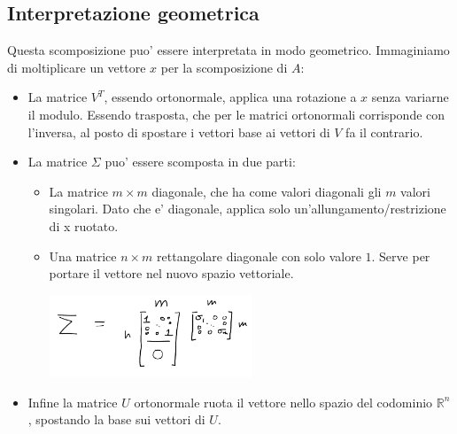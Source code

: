 \subsection{Interpretazione geometrica}
Questa scomposizione puo' essere interpretata in modo geometrico. Immaginiamo di moltiplicare un vettore $ x $ per la scomposizione di $ A $:
\begin{itemize}
  \item La matrice $ V^T $, essendo ortonormale, applica una rotazione a $ x $ senza variarne il modulo. Essendo trasposta, che per le matrici ortonormali corrisponde con l'inversa, al posto di spostare i vettori base ai vettori di $ V $ fa il contrario.
  \item La matrice $ \Sigma $ puo' essere scomposta in due parti:
    \begin{itemize}
      \item La matrice $ m \times m $ diagonale, che ha come valori diagonali gli $ m $ valori singolari. Dato che e' diagonale, applica solo un'allungamento/restrizione di x ruotato.
      \item Una matrice $ n \times m $ rettangolare diagonale con solo valore $ 1 $. Serve per portare il vettore nel nuovo spazio vettoriale. 
      \begin{center}
        \includegraphics[width=0.5\textwidth]{img/2024-11-20-17-27-02.png}
      \end{center}
    \end{itemize}
  \item Infine la matrice $ U $ ortonormale ruota il vettore nello spazio del codominio $ \mathbb{R}^n $, spostando la base sui vettori di $ U $.
\end{itemize}

